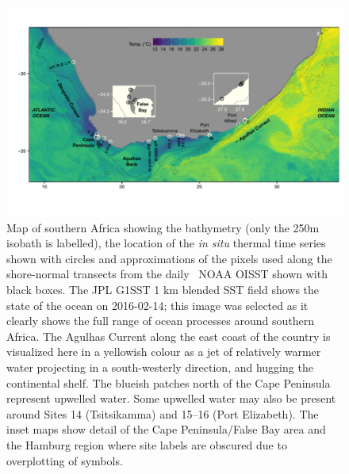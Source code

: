 \documentclass[a4paper,10pt,review]{elsarticle}
\begin{document}
\begin{figure}
\includegraphics[width=1.0\textwidth]{figure1_1km_inset_map_labeled.pdf}
\caption{Map of southern Africa showing the bathymetry (only the 250m isobath is labelled), the location of the \emph{in situ} thermal time series shown with circles and approximations of the pixels used along the shore-normal transects from the daily \degree~NOAA OISST \cite{Reynolds2007} shown with black boxes. The JPL G1SST 1 km blended SST field shows the state of the ocean on 2016-02-14; this image was selected as it clearly shows the full range of ocean processes around southern Africa. The Agulhas Current along the east coast of the country is visualized here in a yellowish colour as a jet of relatively warmer water projecting in a south-westerly direction, and hugging the continental shelf. The blueish patches north of the Cape Peninsula represent upwelled water. Some upwelled water may also be present around Sites 14 (Tsitsikamma) and 15--16 (Port Elizabeth). The inset maps show detail of the Cape Peninsula/False Bay area and the Hamburg region where site labels are obscured due to overplotting of symbols.}
\label{fig:Figure1}
\end{figure}
\end{document}
